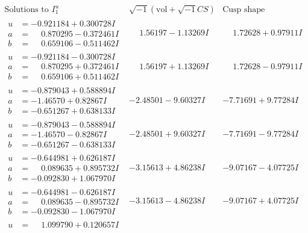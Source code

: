 \documentclass[1p]{elsarticle_modified}
\theoremstyle{definition}
\newcommand{\I}{\sqrt{-1}}
\begin{document}
$$\begin{array}{c|c|c}  
\text{Solutions to }I^u_{1}& \I (\text{vol} + \sqrt{-1}CS) & \text{Cusp shape}\\
 \hline 
\begin{aligned}
u &= -0.921184 + 0.300728 I \\
a &= \phantom{-}0.870295 - 0.372461 I \\
b &= \phantom{-}0.659106 - 0.511462 I\end{aligned}
 & \phantom{-}1.56197 - 1.13269 I & \phantom{-}1.72628 + 0.97911 I \\ \hline\begin{aligned}
u &= -0.921184 - 0.300728 I \\
a &= \phantom{-}0.870295 + 0.372461 I \\
b &= \phantom{-}0.659106 + 0.511462 I\end{aligned}
 & \phantom{-}1.56197 + 1.13269 I & \phantom{-}1.72628 - 0.97911 I \\ \hline\begin{aligned}
u &= -0.879043 + 0.588894 I \\
a &= -1.46570 + 0.82867 I \\
b &= -0.651267 + 0.638133 I\end{aligned}
 & -2.48501 - 9.60327 I & -7.71691 + 9.77284 I \\ \hline\begin{aligned}
u &= -0.879043 - 0.588894 I \\
a &= -1.46570 - 0.82867 I \\
b &= -0.651267 - 0.638133 I\end{aligned}
 & -2.48501 + 9.60327 I & -7.71691 - 9.77284 I \\ \hline\begin{aligned}
u &= -0.644981 + 0.626187 I \\
a &= \phantom{-}0.089635 + 0.895732 I \\
b &= -0.092830 + 1.067970 I\end{aligned}
 & -3.15613 + 4.86238 I & -9.07167 - 4.07725 I \\ \hline\begin{aligned}
u &= -0.644981 - 0.626187 I \\
a &= \phantom{-}0.089635 - 0.895732 I \\
b &= -0.092830 - 1.067970 I\end{aligned}
 & -3.15613 - 4.86238 I & -9.07167 + 4.07725 I \\ \hline\begin{aligned}
u &= \phantom{-}1.099790 + 0.120657 I \\

\end{aligned}
\end{array}$$
\end{document}
